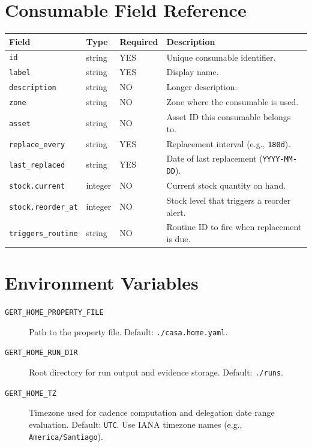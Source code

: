 \section{Consumable Field Reference}
\label{sec:ref-consumable-fields}

\begin{center}
\small
\begin{tabular}{lllp{5.5cm}}
\textbf{Field} & \textbf{Type} & \textbf{Required} & \textbf{Description} \\
\hline
\texttt{id} & string & YES & Unique consumable identifier. \\
\texttt{label} & string & YES & Display name. \\
\texttt{description} & string & NO & Longer description. \\
\texttt{zone} & string & NO & Zone where the consumable is used. \\
\texttt{asset} & string & NO & Asset ID this consumable belongs to. \\
\texttt{replace\_every} & string & YES & Replacement interval (e.g., \texttt{180d}). \\
\texttt{last\_replaced} & string & YES & Date of last replacement (\texttt{YYYY-MM-DD}). \\
\texttt{stock.current} & integer & NO & Current stock quantity on hand. \\
\texttt{stock.reorder\_at} & integer & NO & Stock level that triggers a reorder alert. \\
\texttt{triggers\_routine} & string & NO & Routine ID to fire when replacement is due. \\
\end{tabular}
\end{center}

\section{Environment Variables}
\label{sec:ref-env-vars}

\begin{description}
  \item[\texttt{GERT\_HOME\_PROPERTY\_FILE}] Path to the property file. Default:
        \texttt{./casa.home.yaml}.
  \item[\texttt{GERT\_HOME\_RUN\_DIR}] Root directory for run output and evidence storage.
        Default: \texttt{./runs}.
  \item[\texttt{GERT\_HOME\_TZ}] Timezone used for cadence computation and delegation
        date range evaluation. Default: \texttt{UTC}. Use IANA timezone names
        (e.g., \texttt{America/Santiago}).
\end{description}

